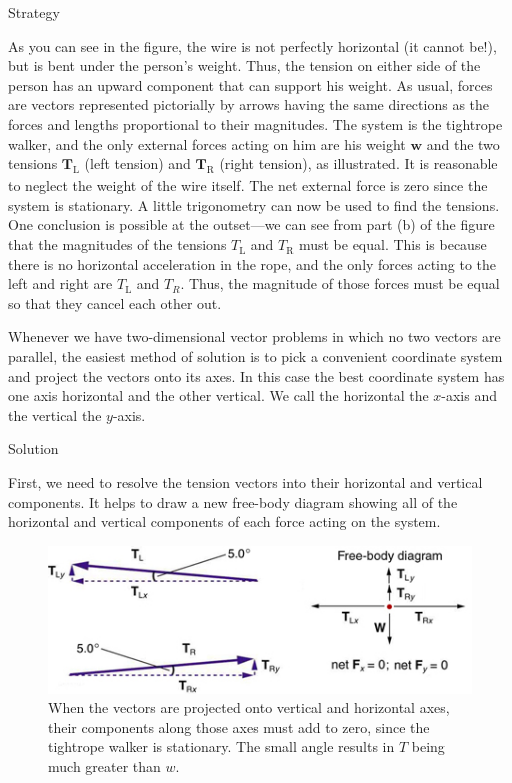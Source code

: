 \documentclass[
]{book}
\newenvironment{tinysection}{}{}
\begin{document}
\begin{tinysection}

{Strategy}

\end{tinysection}

As you can see in the figure, the wire is not perfectly horizontal (it
cannot be!), but is bent under the person's weight. Thus, the tension on
either side of the person has an upward component that can support his
weight. As usual, forces are vectors represented pictorially by arrows
having the same directions as the forces and lengths proportional to
their magnitudes. The system is the tightrope walker, and the only
external forces acting on him are his weight \(\textbf{w}{}\) and the two
tensions \(\textbf{T}_{\text{L}}{}\) (left
\textsubscript{} tension) and \(\textbf{T}_{\text{R}}{}\)
(right tension), as illustrated. It is reasonable to neglect the weight
of the wire itself. The net external force is zero since the system is
stationary. A little trigonometry can now be used to find the tensions.
One conclusion is possible at the outset---we can see from part (b) of
the figure that the magnitudes of the tensions \(T_{\text{L}}{}\) and
\(T_{\text{R}}{}\) must be equal. This is because there is no horizontal
acceleration in the rope, and the only forces acting to the left and
right are \(T_{\text{L}}{}\) and \(T_{R}{}\). Thus, the magnitude of those
forces must be equal so that they cancel each other out.

Whenever we have two-dimensional vector problems in which no two vectors
are parallel, the easiest method of solution is to pick a convenient
coordinate system and project the vectors onto its axes. In this case
the best coordinate system has one axis horizontal and the other
vertical. We call the horizontal the \(x{}\)-axis
\emph{} and the vertical the \(y{}\)-axis.

\begin{tinysection}

{Solution}

\end{tinysection}

First, we need to resolve the tension vectors into their horizontal and
vertical components. It helps to draw a new free-body diagram showing
all of the horizontal and vertical components of each force acting on
the system.

\begin{figure}
\hypertarget{import-auto-id1561864}{%
\centering
\includegraphics{images/Figure_04_05_07.jpg}
\caption{When the vectors are projected onto vertical and horizontal axes,
their components along those axes must add to zero, since the tightrope
walker is stationary. The small angle results in \(T{}\) being much
greater than \(w{}\).}\label{import-auto-id1561864}
}
\end{figure}
\end{document}
